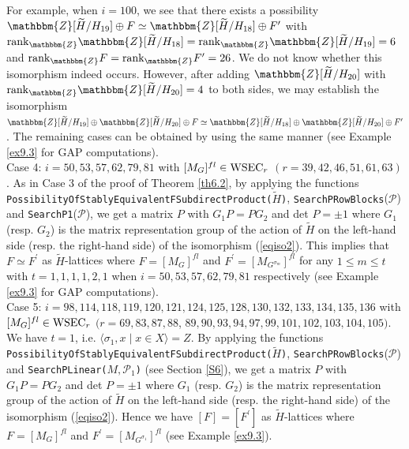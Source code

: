 \documentclass{amsart}
\theoremstyle{plain}
\theoremstyle{definition}
\theoremstyle{remark}
\newcommand{\bZ}{\mathbbm{Z}}\newcommand{\bQ}{\mathbbm{Q}}
\begin{document}
For example, when $i=100$, we see that there exists a possibility 
$\bZ[\widetilde{H}/H_{19}]\oplus F\simeq \bZ[\widetilde{H}/H_{18}]\oplus F^\prime$ with ${\rm rank}_\bZ \bZ[\widetilde{H}/H_{18}]={\rm rank}_\bZ \bZ[\widetilde{H}/H_{19}]=6$ and ${\rm rank}_\bZ F={\rm rank}_\bZ F^\prime=26$. 
We do not know whether this isomorphism indeed occurs. 
However, after adding $\bZ[\widetilde{H}/H_{20}]$ with 
${\rm rank}_\bZ \bZ[\widetilde{H}/H_{20}]=4$ to both sides, 
we may establish the isomorphism 
$\bZ[\widetilde{H}/H_{19}]\oplus\bZ[\widetilde{H}/H_{20}]\oplus F
\simeq 
\bZ[\widetilde{H}/H_{18}]\oplus\bZ[\widetilde{H}/H_{20}]\oplus F^\prime$. 
The remaining cases can be obtained by using the same manner 
(see Example \ref{ex9.3} for GAP computations).\\

Case 4: $i=50,53,57,62,79,81$ 
with 
$[M_G]^{fl}\in {\rm WSEC}_r$ 
$(r=39,42,46,51,61,63)$. 
As in Case 3 of the proof of Theorem \ref{th6.2}, 
by applying the functions 
{\tt PossibilityOfStablyEquivalentFSubdirectProduct($\widetilde{H}$)}, 
{\tt SearchPRowBlocks}($\mathcal{P}$) 
and 
{\tt SearchP1}($\mathcal{P}$), 
we get a matrix $P$ with $G_1P=PG_2$ and det $P=\pm 1$ 
where $G_1$ (resp. $G_2$) 
is the matrix representation group of the action of 
$\widetilde{H}$ on the left-hand side 
(resp. the right-hand side) of the isomorphism (\ref{eqiso2}).  
This implies that $F\simeq F^\prime$ as $\widetilde{H}$-lattices 
where $F=[M_G]^{fl}$ and $F^\prime=[M_{G^{\sigma_m}}]^{fl}$ 
for any $1\leq m\leq t$ with $t=1,1,1,1,2,1$ 
when $i=50,53,57,62,79,81$ respectively (see Example \ref{ex9.3} for GAP computations).\\

Case 5: $i=98,114,118,119,120,121,124,125,128,130,132,133,134,135,136$ 
with 
$[M_G]^{fl}\in {\rm WSEC}_r$ 
$(r=69,83,87,88$, $89,90,93,94,97,99,101,102,103,104,105)$. 
We have $t=1$, i.e. $\langle \sigma_1,x\mid x\in X\rangle=Z$. 
By applying the functions 
{\tt PossibilityOfStablyEquivalentFSubdirectProduct($\widetilde{H}$)}, 
{\tt SearchPRowBlocks}($\mathcal{P}$) 
and {\tt SearchPLinear($M,\mathcal{P}_1$)} (see Section \ref{S6}), 
we get a matrix $P$ with $G_1P=PG_2$ and det $P=\pm 1$ 
where $G_1$ (resp. $G_2$) 
is the matrix representation group of the action of 
$\widetilde{H}$ on the left-hand side 
(resp. the right-hand side) of the isomorphism (\ref{eqiso2}). 
Hence we have $[F]=[F^\prime]$ as 
$\widetilde{H}$-lattices 
where $F=[M_G]^{fl}$ and $F^\prime=[M_{G^{\sigma_1}}]^{fl}$ 
(see Example \ref{ex9.3}). 
\end{document}
